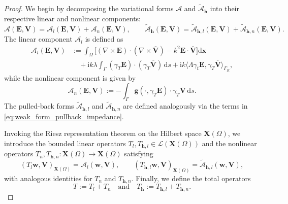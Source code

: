 \documentclass[12pt,reqno]{amsart}
\theoremstyle{definition}
\numberwithin{equation}{section}
\begin{document}
\begin{proof}
We begin by decomposing the variational forms $\mathcal{A}$ and $\widetilde{\mathcal{A}}_{\mathbf{h}}$ into their respective linear and nonlinear components:
\[
\mathcal{A}(\mathbf{E}, \mathbf{V}) = \mathcal{A}_l(\mathbf{E}, \mathbf{V}) + \mathcal{A}_n(\mathbf{E}, \mathbf{V}), \qquad \widetilde{\mathcal{A}}_{\mathbf{h}}(\mathbf{E}, \mathbf{V}) = \widetilde{\mathcal{A}}_{\mathbf{h},l}(\mathbf{E}, \mathbf{V}) + \widetilde{\mathcal{A}}_{\mathbf{h},n}(\mathbf{E}, \mathbf{V}).
\]
The linear component $\mathcal{A}_l$ is defined as
\begin{align*}
\mathcal{A}_l(\mathbf{E}, \mathbf{V}) &:= \int_\Omega \Big[ (\nabla \times \mathbf{E}) \cdot (\nabla \times \overline{\mathbf{V}}) - k^2 \mathbf{E} \cdot \overline{\mathbf{V}} \Big] \mathrm{d}\boldsymbol{x} \\
&\quad + \mathrm{i} k \lambda \int_\Gamma (\gamma_T \mathbf{E}) \cdot (\gamma_T \overline{\mathbf{V}}) \,\mathrm{d}s + \mathrm{i} k \langle \Lambda \gamma_t \mathbf{E}, \gamma_T \overline{\mathbf{V}} \rangle_{\Gamma_R},
\end{align*}
while the nonlinear component is given by
\[
\mathcal{A}_n(\mathbf{E}, \mathbf{V}) := - \int_\Gamma \mathbf{g}(\cdot, \gamma_T \mathbf{E}) \cdot \gamma_T \overline{\mathbf{V}} \,\mathrm{d}s.
\]
The pulled-back forms $\widetilde{\mathcal{A}}_{\mathbf{h},l}$ and $\widetilde{\mathcal{A}}_{\mathbf{h},n}$ are defined analogously via the terms in \eqref{eq:weak_form_pullback_impedance}.

Invoking the Riesz representation theorem on the Hilbert space $\mathbf{X}(\Omega)$, we introduce the bounded linear operators $T_l, T_{\mathbf{h},l} \in \mathcal{L}(\mathbf{X}(\Omega))$ and the nonlinear operators $T_n, T_{\mathbf{h},n} : \mathbf{X}(\Omega) \to \mathbf{X}(\Omega)$ satisfying
\[
(T_l \mathbf{w}, \mathbf{V})_{\mathbf{X}(\Omega)} = \mathcal{A}_l(\mathbf{w}, \mathbf{V}), \qquad (T_{\mathbf{h},l} \mathbf{w}, \mathbf{V})_{\mathbf{X}(\Omega)} = \widetilde{\mathcal{A}}_{\mathbf{h},l}(\mathbf{w}, \mathbf{V}),
\]
with analogous identities for $T_n$ and $T_{\mathbf{h},n}$. Finally, we define the total operators
\[
T := T_l + T_n \quad \text{and} \quad T_{\mathbf{h}} := T_{\mathbf{h},l} + T_{\mathbf{h},n}.
\]



\end{proof}
\end{document}
